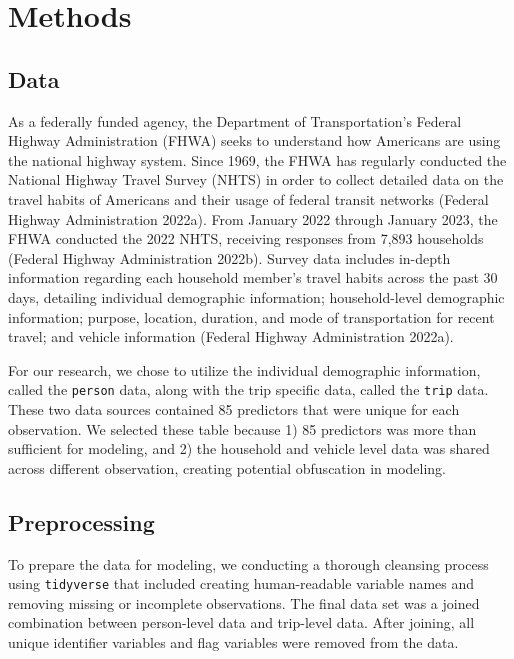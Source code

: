 \documentclass[
  article,
  nofooter]{jss}
\begin{document}
\section{Methods}\label{methods}

\subsection{Data}\label{data}

As a federally funded agency, the Department of Transportation's Federal
Highway Administration (FHWA) seeks to understand how Americans are
using the national highway system. Since 1969, the FHWA has regularly
conducted the National Highway Travel Survey (NHTS) in order to collect
detailed data on the travel habits of Americans and their usage of
federal transit networks (Federal Highway Administration 2022a). From
January 2022 through January 2023, the FHWA conducted the 2022 NHTS,
receiving responses from 7,893 households (Federal Highway
Administration 2022b). Survey data includes in-depth information
regarding each household member's travel habits across the past 30 days,
detailing individual demographic information; household-level
demographic information; purpose, location, duration, and mode of
transportation for recent travel; and vehicle information (Federal
Highway Administration 2022a).

For our research, we chose to utilize the individual demographic
information, called the \texttt{person} data, along with the trip
specific data, called the \texttt{trip} data. These two data sources
contained 85 predictors that were unique for each observation. We
selected these table because 1) 85 predictors was more than sufficient
for modeling, and 2) the household and vehicle level data was shared
across different observation, creating potential obfuscation in
modeling.

\subsection{Preprocessing}\label{preprocessing}

To prepare the data for modeling, we conducting a thorough cleansing
process using \texttt{tidyverse} that included creating human-readable
variable names and removing missing or incomplete observations. The
final data set was a joined combination between person-level data and
trip-level data. After joining, all unique identifier variables and flag
variables were removed from the data.
\end{document}

